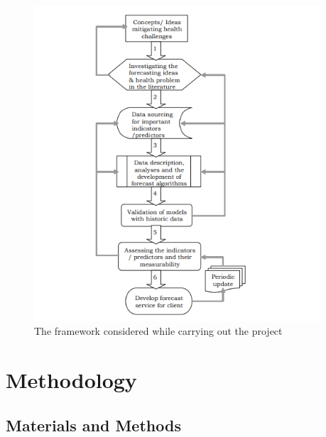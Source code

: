 \documentclass[12pt]{report}
\begin{document}
\begin{figure}[H]%
  \begin {center}
  \includegraphics[width=0.95\textwidth]{images/FlowChart.png}
  \caption{The framework considered while carrying out the project}
  \label{fig:ecg}
  \end {center}
\end{figure}



























\chapter{Methodology}



\section{Materials and Methods}
\end{document}
